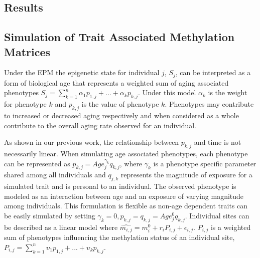 \documentclass{article}
\begin{document}
{{\begin{linenumbers}
\section{Results}

\subsection{Simulation of Trait Associated Methylation Matrices}

Under the EPM the epigenetic state for individual $j$, $S_j$, can be interpreted as a form of biological age that
represents a weighted sum of aging associated phenotypes 
$S_j = \sum^n_{k=1} \alpha_{1} p_{1,j} + ... + \alpha_{k} p_{k,j}$. Under this model $\alpha_{k}$ is the weight for 
phenotype $k$ and $p_{k,j}$ is the value of phenotype $k$.  Phenotypes may contribute to increased or decreased 
aging respectively and when considered as a whole contribute to the overall aging rate observed for an individual.

As shown in our previous work\cite{Snir2019-ii}, the relationship between $p_{k,j}$ and time is not necessarily 
linear. When simulating age associated phenotypes, each phenotype can be represented as 
$p_{k,j} = Age_j^{\gamma_{k}} q_{k,j}$, where $\gamma_{k}$ is a phenotype specific parameter shared among all 
individuals and $q_{j,k}$ represents the magnitude of exposure for a simulated trait and is personal to an 
individual. The observed phenotype is modeled as an interaction between age and an exposure of varying magnitude 
among individuals. This formulation is flexible as non-age dependent traits can be easily simulated by setting 
$\gamma_{k}=0, p_{k,j} = q_{k,j} = Age_j^{0}q_{k,j}$.  Individual sites can be described as a linear model where 
$\hat{m_{i,j}} = m^0_i + r_i P_{i,j} + \epsilon_{i,j}$. $P_{i,j}$ is a weighted sum of phenotypes influencing the 
methylation status of an individual site, $P_{i,j} = \sum^n_{k=1} \upsilon_{1} p_{1,j} + ... + \upsilon_{k} p_{k,j}$. 


\end{linenumbers}}}
\end{document}

